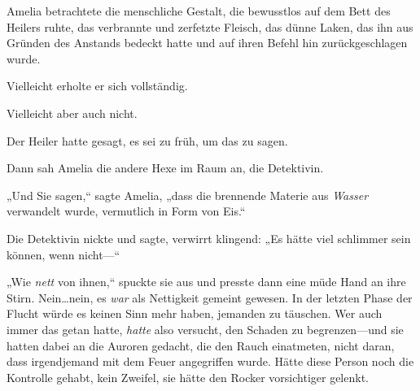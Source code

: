 Amelia betrachtete die menschliche Gestalt, die bewusstlos auf dem Bett des Heilers ruhte, das verbrannte und zerfetzte Fleisch, das dünne Laken, das ihn aus Gründen des Anstands bedeckt hatte und auf ihren Befehl hin zurückgeschlagen wurde.

Vielleicht erholte er sich vollständig.

Vielleicht aber auch nicht.

Der Heiler hatte gesagt, es sei zu früh, um das zu sagen.

Dann sah Amelia die andere Hexe im Raum an, die Detektivin.

„Und Sie sagen,“ sagte Amelia, „dass die brennende Materie aus \emph{Wasser} verwandelt wurde, vermutlich in Form von Eis.“

Die Detektivin nickte und sagte, verwirrt klingend: „Es hätte viel schlimmer sein können, wenn nicht—“

„Wie \emph{nett} von ihnen,“ spuckte sie aus und presste dann eine müde Hand an ihre Stirn. Nein…nein, es \emph{war} als Nettigkeit gemeint gewesen. In der letzten Phase der Flucht würde es keinen Sinn mehr haben, jemanden zu täuschen. Wer auch immer das getan hatte, \emph{hatte} also versucht, den Schaden zu begrenzen—und sie hatten dabei an die Auroren gedacht, die den Rauch einatmeten, nicht daran, dass irgendjemand mit dem Feuer angegriffen wurde. Hätte diese Person noch die Kontrolle gehabt, kein Zweifel, sie hätte den Rocker vorsichtiger gelenkt.

